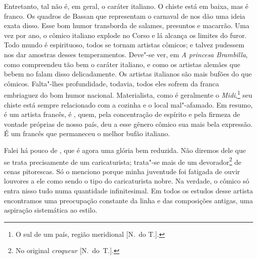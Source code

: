 Entretanto, tal não é, em geral, o caráter italiano. O chiste está em
baixa, mas é franco. Os quadros de Bassan que representam o carnaval de
 nos dão uma ideia exata disso. Esse bom humor transborda de
salames, presuntos e macarrão. Uma vez por ano, o cômico italiano
explode no Corso e lá alcança os limites do furor. Todo mundo é
espirituoso, todos se tornam artistas cômicos;  e 
talvez pudessem nos dar amostras desses temperamentos. Deve"-se ver, em
\textit{A princesa Brambilla}, como  compreendeu tão bem o
caráter italiano, e como os artistas alemães que bebem no 
falam disso delicadamente. Os artistas italianos são mais bufões do que
cômicos. Falta"-lhes profundidade, todavia, todos eles sofrem da franca
embriaguez do bom humor nacional. Materialista, como é geralmente o
\textit{Midi},\footnote{ O sul de um país, região meridional [N.~do
T.].}\textit{ }seu chiste está sempre relacionado com a cozinha e o
local mal"-afamado. Em resumo, é um artista francês, é , quem,
pela concentração de espírito e pela firmeza de vontade próprias de
nosso país, deu a esse gênero cômico sua mais bela expressão. É um
francês que permaneceu o melhor bufão italiano.

Falei há pouco de , que é agora uma glória bem reduzida. Não
diremos dele que se trata precisamente de um caricaturista; trata"-se
mais de um devorador\footnote{ No original \textit{croqueur }[N.~do~T.].} 
de cenas pitorescas. Só o menciono porque minha juventude foi
fatigada de ouvir louvores a ele como sendo o tipo do caricaturista
nobre. Na verdade, o cômico só entra nisso tudo numa quantidade
infinitesimal. Em todos os estudos desse artista encontramos uma
preocupação constante da linha e das composições antigas, uma aspiração
sistemática ao estilo.

